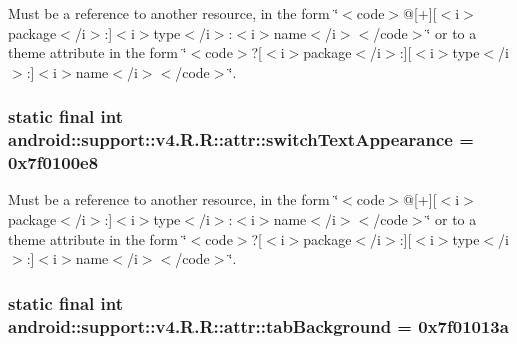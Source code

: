 Must be a reference to another resource, in the form \char`\"{}$<$code$>$@\mbox{[}+\mbox{]}\mbox{[}$<$i$>$package$<$/i$>$:\mbox{]}$<$i$>$type$<$/i$>$:$<$i$>$name$<$/i$>$$<$/code$>$\char`\"{} or to a theme attribute in the form \char`\"{}$<$code$>$?\mbox{[}$<$i$>$package$<$/i$>$:\mbox{]}\mbox{[}$<$i$>$type$<$/i$>$:\mbox{]}$<$i$>$name$<$/i$>$$<$/code$>$\char`\"{}. \hypertarget{classandroid_1_1support_1_1v4_1_1_r_1_1attr_834dd0b00a0bf0eec4af628cb19fcc84}{
\subsubsection[{switchTextAppearance}]{\setlength{\rightskip}{0pt plus 5cm}static final int android::support::v4.R.R::attr::switchTextAppearance = 0x7f0100e8}}
\label{classandroid_1_1support_1_1v4_1_1_r_1_1attr_834dd0b00a0bf0eec4af628cb19fcc84}


Must be a reference to another resource, in the form \char`\"{}$<$code$>$@\mbox{[}+\mbox{]}\mbox{[}$<$i$>$package$<$/i$>$:\mbox{]}$<$i$>$type$<$/i$>$:$<$i$>$name$<$/i$>$$<$/code$>$\char`\"{} or to a theme attribute in the form \char`\"{}$<$code$>$?\mbox{[}$<$i$>$package$<$/i$>$:\mbox{]}\mbox{[}$<$i$>$type$<$/i$>$:\mbox{]}$<$i$>$name$<$/i$>$$<$/code$>$\char`\"{}. \hypertarget{classandroid_1_1support_1_1v4_1_1_r_1_1attr_5b9a90e4628861819ccf24233f61637c}{
\subsubsection[{tabBackground}]{\setlength{\rightskip}{0pt plus 5cm}static final int android::support::v4.R.R::attr::tabBackground = 0x7f01013a}}
\label{classandroid_1_1support_1_1v4_1_1_r_1_1attr_5b9a90e4628861819ccf24233f61637c}


